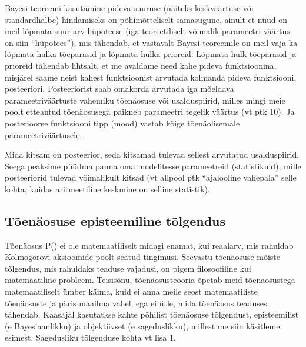 \documentclass[]{book}
\begin{document}
Bayesi teoreemi kasutamine pideva suuruse (näiteks keskväärtuse või standardhälbe) hindamiseks on põhimõtteliselt samasugune, ainult et nüüd on meil lõpmata suur arv hüpoteese (iga teoreetiliselt võimalik parameetri väärtus on siin ``hüpotees''), mis tähendab, et vastavalt Bayesi teoreemile on meil vaja ka lõpmata hulka tõepärasid ja lõpmata hulka prioreid. Lõpmata hulk tõepärasid ja prioreid tähendab lihtsalt, et me avaldame need kahe pideva funktsioonina, misjärel saame neist kahest funktsioonist arvutada kolmanda pideva funktsiooni, posteeriori. Posteeriorist saab omakorda arvutada iga mõeldava parameetriväärtuste vahemiku tõenäosuse või usalduspiirid, milles mingi meie poolt etteantud tõenäosusega paikneb parameetri tegelik väärtus (vt ptk 10). Ja posterioorse funktsiooni tipp (mood) vastab kõige tõenäolisemale parameetriväärtusele.

Mida kitsam on posteerior, seda kitsamad tulevad sellest arvutatud usalduspiirid. Seega peaksime püüdma panna oma mudelitesse parameetreid (statistikuid), mille posteeriorid tulevad võimalikult kitsad (vt allpool ptk ``ajalooline vahepala'' selle kohta, kuidas aritmeetiline keskmine on selline statistik).

\hypertarget{toenaosuse-episteemiline-tolgendus}{%
\subsection*{Tõenäosuse episteemiline tõlgendus}\label{toenaosuse-episteemiline-tolgendus}}

Tõenäosus P() ei ole matemaatiliselt midagi enamat, kui reaalarv, mis rahuldab Kolmogorovi aksioomide poolt seatud tingimusi. Seevastu tõenäosuse mõiste tõlgendus, mis rahuldaks teaduse vajadusi, on pigem filosoofiline kui matemaatiline probleem.
Teisisõnu, tõenäosusteooria õpetab meid tõenäosustega matemaatiliselt ümber käima, kuid ei anna meile seost matemaatiliste tõenäosuste ja päris maailma vahel, ega ei ütle, mida tõenäosus teaduses tähendab. Kaasajal kasutatkse kahte põhilist tõenäosuse tõlgendust, episteemilist (e Bayesiaanlikku) ja objektiivset (e sageduslikku), millest me siin käsitleme esimest. Sagedusliku tõlgenduse kohta vt lisa 1.
\end{document}
